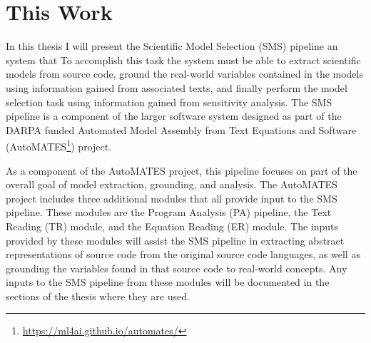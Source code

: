 \section{This Work\label{sec:this_work}}
In this thesis I will present the Scientific Model Selection (SMS) pipeline \ctm{:}  %
an %
system that
To accomplish this task the system must be able to extract scientific models from source code, ground the real-world variables contained in the models using information gained from associated texts, and finally perform the model selection task using information gained from sensitivity analysis.
The SMS pipeline is a component of the larger software system designed as part of the DARPA funded Automated Model Assembly from Text Equations and Software (AutoMATES\footnote{\url{https://ml4ai.github.io/automates/}}) project.

As a component of the AutoMATES project, this pipeline focuses on part of the overall goal of model extraction, grounding, and analysis.
The AutoMATES project includes three additional modules that all provide input to the SMS pipeline.
These modules are the Program Analysis (PA) pipeline, the Text Reading (TR) module, and the Equation Reading (ER) module.
The inputs provided by these modules will assist the SMS pipeline in extracting abstract representations of source code from the original source code languages, as well as grounding the variables found in that source code to real-world concepts.
Any inputs to the SMS pipeline from these modules will be documented in the sections of the thesis where they are used.

